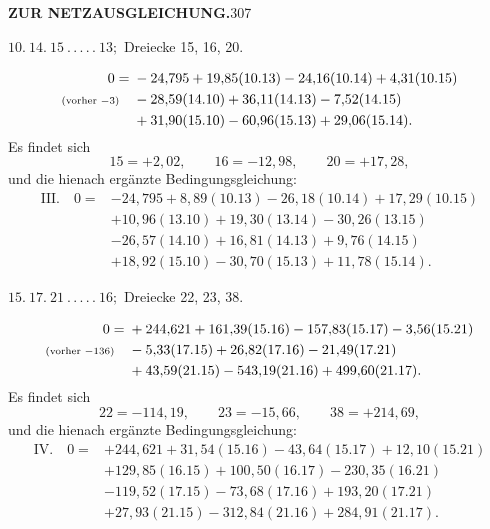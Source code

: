 \newpage
\noindent\textbf{ZUR NETZAUSGLEICHUNG.}\hfill307
\begin{center}
$10.\ 14.\ 15\ .\,.\,.\,.\,.\ 13;$ Dreiecke 15, 16, 20.
\end{center}
\[
\begin{aligned}
0={}&-24{,}795+19{,}85(10.13)-24{,}16(10.14)+4{,}31(10.15)\\
\text{\scriptsize(vorher $-3$)}\quad&-28{,}59(14.10)+36{,}11(14.13)-7{,}52(14.15)\\
&+31{,}90(15.10)-60{,}96(15.13)+29{,}06(15.14).
\end{aligned}
\]
Es findet sich
\[
15=+2{,}02,\qquad16=-12{,}98,\qquad20=+17{,}28,
\]
und die hienach ergänzte Bedingungsgleichung:
\[
\begin{aligned}
\mathrm{III.}\quad0={}&-24{,}795+8{,}89(10.13)-26{,}18(10.14)+17{,}29(10.15)\\
&+10{,}96(13.10)+19{,}30(13.14)-30{,}26(13.15)\\
&-26{,}57(14.10)+16{,}81(14.13)+9{,}76(14.15)\\
&+18{,}92(15.10)-30{,}70(15.13)+11{,}78(15.14).
\end{aligned}
\]

\par\bigskip
\begin{center}
$15.\ 17.\ 21\ .\,.\,.\,.\,.\ 16;$ Dreiecke 22, 23, 38.
\end{center}
\[
\begin{aligned}
0={}&+244{,}621+161{,}39(15.16)-157{,}83(15.17)-3{,}56(15.21)\\
\text{\scriptsize(vorher $-136$)}\quad&-5{,}33(17.15)+26{,}82(17.16)-21{,}49(17.21)\\
&+43{,}59(21.15)-543{,}19(21.16)+499{,}60(21.17).
\end{aligned}
\]
Es findet sich
\[
22=-114{,}19,\qquad23=-15{,}66,\qquad38=+214{,}69,
\]
und die hienach ergänzte Bedingungsgleichung:
\[
\begin{aligned}
\mathrm{IV.}\quad0={}&+244{,}621+31{,}54(15.16)-43{,}64(15.17)+12{,}10(15.21)\\
&+129{,}85(16.15)+100{,}50(16.17)-230{,}35(16.21)\\
&-119{,}52(17.15)-73{,}68(17.16)+193{,}20(17.21)\\
&+27{,}93(21.15)-312{,}84(21.16)+284{,}91(21.17).
\end{aligned}
\]

